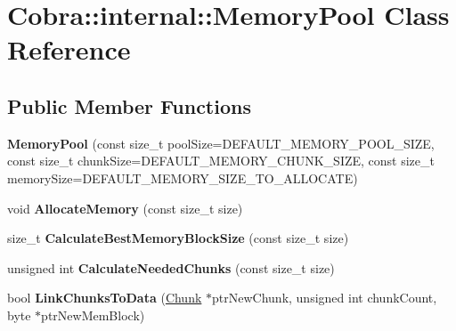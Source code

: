 \hypertarget{class_cobra_1_1internal_1_1_memory_pool}{\section{Cobra\+:\+:internal\+:\+:Memory\+Pool Class Reference}
\label{class_cobra_1_1internal_1_1_memory_pool}
}
\subsection*{Public Member Functions}
\begin{DoxyCompactItemize}
\item 
\hypertarget{class_cobra_1_1internal_1_1_memory_pool_a16b83d41c08e1239b071844473083857}{{\bfseries Memory\+Pool} (const size\+\_\+t pool\+Size=D\+E\+F\+A\+U\+L\+T\+\_\+\+M\+E\+M\+O\+R\+Y\+\_\+\+P\+O\+O\+L\+\_\+\+S\+I\+Z\+E, const size\+\_\+t chunk\+Size=D\+E\+F\+A\+U\+L\+T\+\_\+\+M\+E\+M\+O\+R\+Y\+\_\+\+C\+H\+U\+N\+K\+\_\+\+S\+I\+Z\+E, const size\+\_\+t memory\+Size=D\+E\+F\+A\+U\+L\+T\+\_\+\+M\+E\+M\+O\+R\+Y\+\_\+\+S\+I\+Z\+E\+\_\+\+T\+O\+\_\+\+A\+L\+L\+O\+C\+A\+T\+E)}\label{class_cobra_1_1internal_1_1_memory_pool_a16b83d41c08e1239b071844473083857}

\item 
\hypertarget{class_cobra_1_1internal_1_1_memory_pool_a9856df38267a9efebf3491e36c888e92}{void {\bfseries Allocate\+Memory} (const size\+\_\+t size)}\label{class_cobra_1_1internal_1_1_memory_pool_a9856df38267a9efebf3491e36c888e92}

\item 
\hypertarget{class_cobra_1_1internal_1_1_memory_pool_a1cbcd50cc9e71622964a11a316d8845c}{size\+\_\+t {\bfseries Calculate\+Best\+Memory\+Block\+Size} (const size\+\_\+t size)}\label{class_cobra_1_1internal_1_1_memory_pool_a1cbcd50cc9e71622964a11a316d8845c}

\item 
\hypertarget{class_cobra_1_1internal_1_1_memory_pool_a1ce270b088d5c360dbb0f115b917a165}{unsigned int {\bfseries Calculate\+Needed\+Chunks} (const size\+\_\+t size)}\label{class_cobra_1_1internal_1_1_memory_pool_a1ce270b088d5c360dbb0f115b917a165}

\item 
\hypertarget{class_cobra_1_1internal_1_1_memory_pool_a62abd47f334b4ab4b4cb62973fa52059}{bool {\bfseries Link\+Chunks\+To\+Data} (\hyperlink{struct_cobra_1_1internal_1_1_chunk}{Chunk} $\ast$ptr\+New\+Chunk, unsigned int chunk\+Count, byte $\ast$ptr\+New\+Mem\+Block)}\label{class_cobra_1_1internal_1_1_memory_pool_a62abd47f334b4ab4b4cb62973fa52059}


\end{DoxyCompactItemize}
